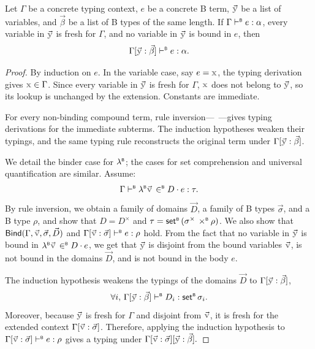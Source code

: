 \begin{theorem}
  Let \(\Gamma\) be a concrete typing context, \(e\) be a concrete B term, \(\vec{\var{y}}\) be a list of variables, and \(\vec\beta\) be a list of B types of the same length. If \(\Gamma \vdash^{\scriptscriptstyle{\mathsf{B}}} e : \alpha\), every variable in \(\vec{\var{y}}\) is fresh for \(\Gamma\), and no variable in \(\vec{\var{y}}\) is bound in \(e\), then
  \[
    \btype{\Gamma[\vec{\var{y}}:\vec\beta]}{e}{\alpha}.
  \]
\end{theorem}
\begin{proof}
  By induction on \(e\). In the variable case, say \(e = \var{x}\), the typing derivation gives \(\var{x} \in \Gamma\). Since every variable in \(\vec{\var{y}}\) is fresh for \(\Gamma\), \(\var{x}\) does not belong to \(\vec{\var{y}}\), so its lookup is unchanged by the extension. Constants are immediate.

  For every non-binding compound term, rule inversion---\eg~---gives typing derivations for the immediate subterms.
  The induction hypotheses weaken their typings, and the same typing rule reconstructs the original term under \(\Gamma[\vec{\var{y}}:\vec\beta]\).

  We detail the binder case for \(\mathord{\lambda^{\scriptscriptstyle{\mathsf{B}}}}\); the cases for set comprehension and universal quantification are similar. Assume:
  \[
    \btype{\Gamma}{\lambdaB \vec{\var{v}} \inB D \cdot e}{\tau}.
  \]
  By rule inversion, we obtain a family of domains \(\vec D\), a family of B types \(\vec\sigma\), and a B type \(\rho\), and show that \(D = D^\times\) and \(\tau = \mathsf{set}^{\scriptscriptstyle{\mathsf{B}}}\,(\sigma^\times \mathbin{\,\times^{\scriptscriptstyle{\mathsf{B}}}} \rho)\). We also show that \(\mathsf{Bind}(\Gamma,\vec{\var{v}},\vec\sigma,\vec D)\) and \(\btype{\Gamma[\vec{\var{v}}:\vec\sigma]}{e}{\rho}\) hold.
  From the fact that no variable in \(\vec{\var{y}}\) is bound in \(\lambdaB \vec{\var{v}} \inB D \cdot e\), we get that \(\vec{\var{y}}\) is disjoint from the bound variables \(\vec{\var{v}}\), is not bound in the domains \(\vec D\), and is not bound in the body \(e\).

  The induction hypothesis weakens the typings of the domains \(\vec D\) to \(\Gamma[\vec{\var{y}}:\vec\beta]\), \ie
  \[
    \forall i,\, \btype{\Gamma[\vec{\var{y}}:\vec\beta]}{D_i}{\setB\sigma_i}.
  \]
  Moreover, because \(\vec{\var{y}}\) is fresh for \(\Gamma\) and disjoint from \(\vec{\var{v}}\), it is fresh for the extended context \(\Gamma[\vec{\var{v}}:\vec\sigma]\). Therefore, applying the induction hypothesis to \(\btype{\Gamma[\vec{\var{v}}:\vec\sigma]}{e}{\rho}\) gives a typing under
  \(
    \Gamma[\vec{\var{v}}:\vec\sigma][\vec{\var{y}}:\vec\beta].
  \)


\end{proof}
